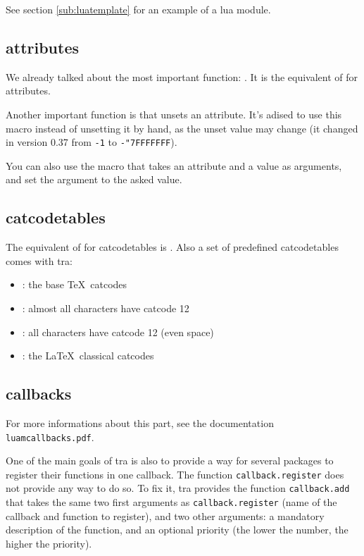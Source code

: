 \documentclass{article}
\begin{document}
See section \ref{sub:luatemplate} for an example of a lua module.

\subsection{attributes}

We already talked about the most important function:
\texttt{\string\newluaattribute}. It is the equivalent of
\texttt{\string\newcount} for attributes.

Another important function is \texttt{\string\unsetluaattribute} that unsets
an attribute. It's adised to use this macro instead of unsetting it by hand,
as the unset value may change (it changed in version 0.37 from \texttt{-1} to
\texttt{-"7FFFFFFF}).

You can also use the macro \texttt{\string\setluaattribute} that takes an
attribute and a value as arguments, and set the argument to the asked value.

\subsection{catcodetables}

The equivalent of \texttt{\string\newcount} for catcodetables is
\texttt{\string\newluacatcodetable}. Also a set of predefined catcodetables
comes with \LuaTeX tra:

\begin{itemize}
  \item \texttt{\string\CatcodeTableIniTeX}: the base \TeX\ catcodes
  \item \texttt{\string\CatcodeTableString}: almost all characters have
    catcode 12
  \item \texttt{\string\CatcodeTableOther}: all characters have catcode 12
    (even space)
  \item \texttt{\string\CatcodeTableLaTeX}: the \LaTeX\ classical catcodes
\end{itemize}

\subsection{callbacks}

For more informations about this part, see the documentation
\texttt{luamcallbacks.pdf}.

One of the main goals of \LuaTeX tra is also to provide a way for several
packages to register their functions in one callback. The function
\texttt{callback.register} does not provide any way to do so. To fix it,
\LuaTeX tra provides the function \texttt{callback.add} that takes the same
two first arguments as \texttt{callback.register} (name of the callback and
function to register), and two other arguments: a mandatory description of the
function, and an optional priority (the lower the number, the higher the
priority).
\end{document}
